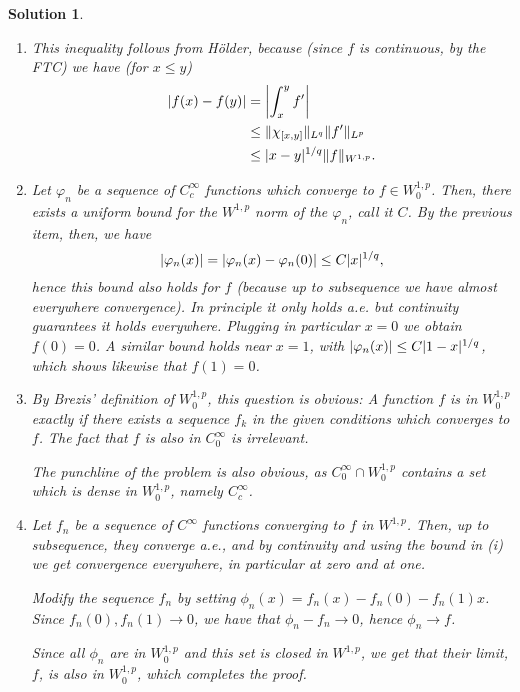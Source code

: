 \documentclass{article}
\theoremstyle{nonumberplain}
\newtheorem{sol}{Solution}
\DeclarePairedDelimiter{\abs}{\lvert}{\rvert}
\DeclarePairedDelimiter{\Norm}{\lVert}{\rVert}
\begin{document}
\begin{sol}
\leavevmode
\begin{enumerate}
\item This inequality follows from Hölder, because (since $f$ is continuous, by the FTC) we have (for $x \leq y$)
\begin{equation}
\begin{aligned}
\abs{f(x) - f(y)}
&= \abs*{\int_x^y f'}\\
&\leq \Norm{\chi_{\interval xy}}_{L^q} \Norm{f'}_{L^p}\\
&\leq \abs{x-y}^{1/q} \Norm{f}_{W^{1,p}}.
\end{aligned}
\end{equation}
\item Let $\varphi_n$ be a sequence of $C^\infty_c$ functions which converge to $f \in W^{1,p}_0$. Then, there exists a uniform bound for the $W^{1,p}$ norm of the $\varphi_n$, call it $C$. By the previous item, then, we have
\begin{equation}
\abs{\varphi_n(x)} = \abs{\varphi_n(x) - \varphi_n(0)} \leq C \abs{x}^{1/q},
\end{equation}
hence this bound also holds for $f$ (because up to subsequence we have almost everywhere convergence). In principle it only holds a.e. but continuity guarantees it holds everywhere. Plugging in particular $x = 0$ we obtain $f(0) = 0$. A similar bound holds near $x = 1$, with $\abs{\varphi_n(x)} \leq C \abs{1-x}^{1/q}$, which shows likewise that $f(1) = 0$.
\item By Brezis' definition of $W^{1,p}_0$, this question is obvious: A function $f$ is in $W^{1,p}_0$ exactly if there exists a sequence $f_k$ in the given conditions which converges to $f$. The fact that $f$ is also in $C^\infty_0$ is irrelevant.

The punchline of the problem is also obvious, as $C^\infty_0 \cap W^{1,p}_0$ contains a set which is dense in $W^{1,p}_0$, namely $C^\infty_c$.

\item Let $f_n$ be a sequence of $C^\infty$ functions converging to $f$ in $W^{1,p}$. Then, up to subsequence, they converge a.e., and by continuity and using the bound in (i) we get convergence everywhere, in particular at zero and at one.

Modify the sequence $f_n$ by setting $\phi_n(x) = f_n(x) - f_n(0) - f_n(1) x$. Since $f_n(0), f_n(1) \to 0$, we have that $\phi_n - f_n \to 0$, hence $\phi_n \to f$.

Since all $\phi_n$ are in $W^{1,p}_0$ and this set is closed in $W^{1,p}$, we get that their limit, $f$, is also in $W^{1,p}_0$, which completes the proof.
\end{enumerate}
\end{sol}
\end{document}
